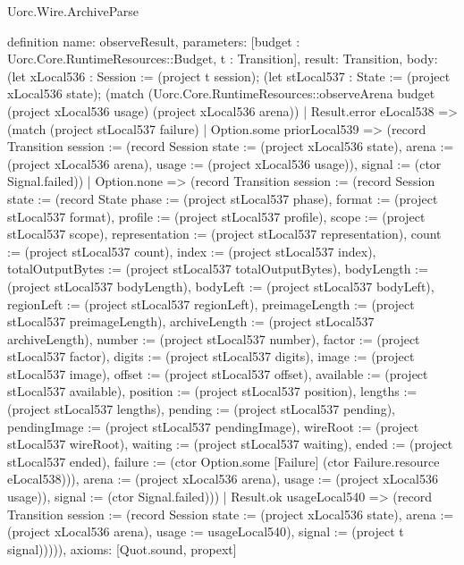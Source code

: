 \begin{lexlean}{Uorc.Wire.ArchiveParse}
\begin{semanticmodule}
definition{
  name: observeResult,
  parameters: [budget : Uorc.Core.RuntimeResources::Budget, t : Transition],
  result: Transition,
  body: (let xLocal536 : Session := (project t session); (let stLocal537 : State := (project xLocal536 state); (match (Uorc.Core.RuntimeResources::observeArena budget (project xLocal536 usage) (project xLocal536 arena))
    | Result.error eLocal538 => (match (project stLocal537 failure)
      | Option.some priorLocal539 => (record Transition {session := (record Session {state := (project xLocal536 state), arena := (project xLocal536 arena), usage := (project xLocal536 usage)}), signal := (ctor Signal.failed)})
      | Option.none => (record Transition {session := (record Session {state := (record State {phase := (project stLocal537 phase), format := (project stLocal537 format), profile := (project stLocal537 profile), scope := (project stLocal537 scope), representation := (project stLocal537 representation), count := (project stLocal537 count), index := (project stLocal537 index), totalOutputBytes := (project stLocal537 totalOutputBytes), bodyLength := (project stLocal537 bodyLength), bodyLeft := (project stLocal537 bodyLeft), regionLeft := (project stLocal537 regionLeft), preimageLength := (project stLocal537 preimageLength), archiveLength := (project stLocal537 archiveLength), number := (project stLocal537 number), factor := (project stLocal537 factor), digits := (project stLocal537 digits), image := (project stLocal537 image), offset := (project stLocal537 offset), available := (project stLocal537 available), position := (project stLocal537 position), lengths := (project stLocal537 lengths), pending := (project stLocal537 pending), pendingImage := (project stLocal537 pendingImage), wireRoot := (project stLocal537 wireRoot), waiting := (project stLocal537 waiting), ended := (project stLocal537 ended), failure := (ctor Option.some [Failure] (ctor Failure.resource eLocal538))}), arena := (project xLocal536 arena), usage := (project xLocal536 usage)}), signal := (ctor Signal.failed)}))
    | Result.ok usageLocal540 => (record Transition {session := (record Session {state := (project xLocal536 state), arena := (project xLocal536 arena), usage := usageLocal540}), signal := (project t signal)})))),
  axioms: [Quot.sound, propext]
}


\end{semanticmodule}
\end{lexlean}
